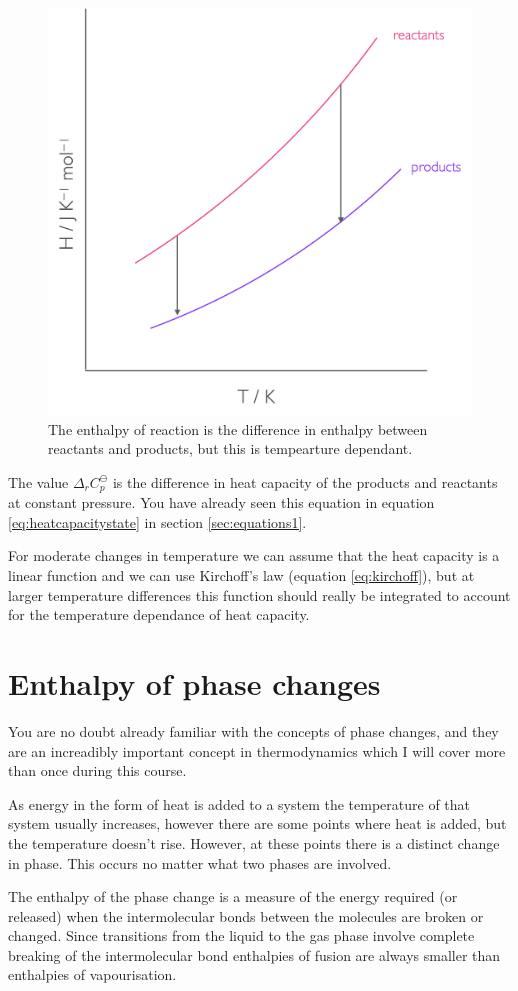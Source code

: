 \documentclass[
]{book}
\begin{document}
\begin{figure}

{\centering \includegraphics[width=0.3\linewidth]{images/enthalpytemp} 

}

\caption{The enthalpy of reaction is the difference in enthalpy between reactants and products, but this is tempearture dependant.}\label{fig:enthalpytemp}
\end{figure}

The value \(\Delta_r C_p^{\ominus}\) is the difference in heat capacity of the products and reactants at constant pressure. You have already seen this equation in equation \eqref{eq:heatcapacitystate} in section \ref{sec:equations1}.

For moderate changes in temperature we can assume that the heat capacity is a linear function and we can use Kirchoff's law (equation \eqref{eq:kirchoff}), but at larger temperature differences this function should really be integrated to account for the temperature dependance of heat capacity.

\hypertarget{enthalpy-of-phase-changes}{%
\section{Enthalpy of phase changes}\label{enthalpy-of-phase-changes}}

You are no doubt already familiar with the concepts of phase changes, and they are an increadibly important concept in thermodynamics which I will cover more than once during this course.

As energy in the form of heat is added to a system the temperature of that system usually increases, however there are some points where heat is added, but the temperature doesn't rise. However, at these points there is a distinct change in phase. This occurs no matter what two phases are involved.

The enthalpy of the phase change is a measure of the energy required (or released) when the intermolecular bonds between the molecules are broken or changed. Since transitions from the liquid to the gas phase involve complete breaking of the intermolecular bond enthalpies of fusion are always smaller than enthalpies of vapourisation.
\end{document}
